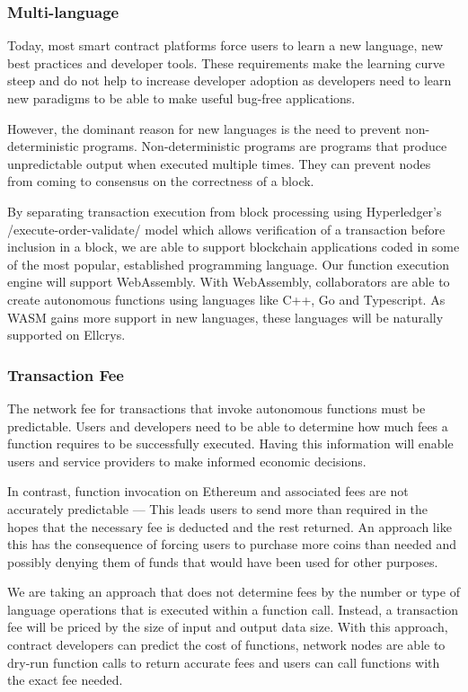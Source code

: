 \subsubsection{Multi-language}
Today, most smart contract platforms force users to learn a new language, new best practices and developer tools. These requirements make the learning curve steep and do not help to increase developer adoption as developers need to learn new paradigms to be able to make useful bug-free applications.

However, the dominant reason for new languages is the need to prevent non-deterministic programs. Non-deterministic programs are programs that produce unpredictable output when executed multiple times. They can prevent nodes from coming to consensus on the correctness of a block.

By separating transaction execution from block processing using Hyperledger’s /execute-order-validate/ model which allows verification of a transaction before inclusion in a block, we are able to support blockchain applications coded in some of the most popular, established programming language. Our function execution engine will support WebAssembly. With WebAssembly, collaborators are able to create autonomous functions using languages like C++, Go and Typescript. As WASM gains more support in new languages, these languages will be naturally supported on Ellcrys.


\subsubsection{Transaction Fee}
The network fee for transactions that invoke autonomous functions must be predictable. Users and developers need to be able to determine how much fees a function requires to be successfully executed. Having this information will enable users and service providers to make informed economic decisions.

In contrast, function invocation on Ethereum and associated fees are not accurately predictable — This leads users to send more than required in the hopes that the necessary fee is deducted and the rest returned. An approach like this has the consequence of forcing users to purchase more coins than needed and possibly denying them of funds that would have been used for other purposes.

We are taking an approach that does not determine fees by the number or type of language operations that is executed within a function call. Instead, a transaction fee will be priced by the size of input and output data size. With this approach, contract developers can predict the cost of functions, network nodes are able to dry-run function calls to return accurate fees and users can call functions with the exact fee needed.

